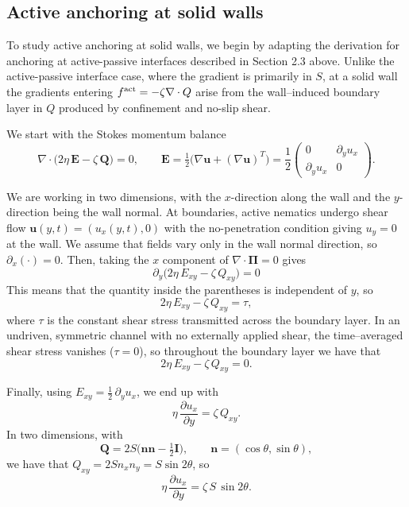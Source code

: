 \documentclass[11pt]{article}
\begin{document}
\subsection{Active anchoring at solid walls}
\label{sec:active_anchoring_at_solid_walls}

To study active anchoring at solid walls, we begin by adapting the derivation for anchoring at active-passive interfaces described in Section 2.3 above. Unlike the active-passive interface case, where the gradient is primarily in $S$, at a solid wall the gradients entering $f^{\rm act}=-\zeta\nabla\cdot Q$ arise from the wall--induced boundary layer in $Q$ produced by confinement and no-slip shear.

We start with the Stokes momentum balance $$\nabla\!\cdot\!\big(2\eta\,\mathbf{E}-\zeta\,\mathbf{Q}\big)=0,
\qquad
\mathbf{E}=\tfrac12\big(\nabla\mathbf{u}+(\nabla\mathbf{u})^{T}\big) = \frac{1}{2}\begin{pmatrix}
    0 & \partial_y u_x \\
    \partial_y u_x & 0
\end{pmatrix}.$$

\pagebreak
We are working in two dimensions, with the $x$-direction along the wall and the $y$-direction being the wall normal. At boundaries, active nematics undergo shear flow $\mathbf{u}(y,t)=(u_x(y,t),0)$ with the no-penetration condition giving $u_y = 0$ at the wall. We assume that fields vary only in the wall normal direction, so $\partial_x(\cdot)=0$. Then, taking the $x$ component of $\nabla\!\cdot\!\boldsymbol{\Pi}=0$ gives
\begin{equation}
    \partial_y\big(2\eta\,E_{xy}-\zeta\,Q_{xy}\big)=0
\end{equation}
This means that the quantity inside the parentheses is independent of $y$, so $$2\eta\,E_{xy}-\zeta\,Q_{xy}=\tau,$$
where $\tau$ is the constant shear stress transmitted across the boundary layer. In an undriven, symmetric channel with no externally applied shear, the time--averaged shear stress vanishes ($\tau=0$), so throughout the boundary layer we have that 
\begin{equation}
    2\eta\,E_{xy}-\zeta\,Q_{xy}=0.
\end{equation}

Finally, using $E_{xy}=\tfrac12\,\partial_y u_x$, we end up with 
\begin{equation}
\eta\,\frac{\partial u_x}{\partial y}
=\zeta\,Q_{xy}.
\end{equation}
In two dimensions, with
$$\mathbf{Q}=2S\big(\mathbf{n}\mathbf{n}-\tfrac12\mathbf{I}\big),
\qquad \mathbf{n}=(\cos\theta,\sin\theta),$$
we have that $Q_{xy}=2S n_x n_y = S\sin 2\theta$, so
\begin{equation}
\eta\,\frac{\partial u_x}{\partial y} = \zeta\,S\,\sin 2\theta.
\label{eq:activity_vel}
\end{equation}
\end{document}
